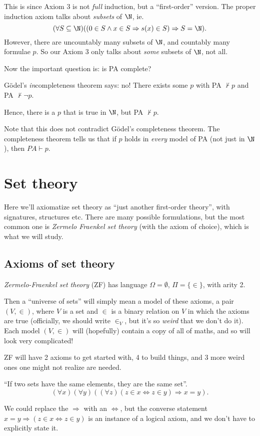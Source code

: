 \documentclass[a4paper]{article}
\begin{document}
This is since Axiom 3 is not \emph{full} induction, but a ``first-order'' version. The proper induction axiom talks about \emph{subsets} of $\N$, ie.
\[
  (\forall S\subseteq \N )((0 \in S \wedge x\in S \Rightarrow s(x)\in S)\Rightarrow S=\N).
\]
However, there are uncountably many subsets of $\N$, and countably many formulae $p$. So our Axiom 3 only talks about \emph{some} subsets of $\N$, not all.

Now the important question is: is PA complete?

G\"odel's \emph{in}completeness theorem says: no! There exists some $p$ with PA $\not\vdash p$ and PA $\not\vdash \neg p$.

Hence, there is a $p$ that is true in $\N$, but PA $\not\vdash p$.

Note that this does not contradict G\"odel's completeness theorem. The completeness theorem tells us that if $p$ holds in \emph{every} model of PA (not just in $\N$), then $PA\vdash p$.

\section{Set theory}
Here we'll axiomatize set theory as ``just another first-order theory'', with signatures, structures etc. There are many possible formulations, but the most common one is \emph{Zermelo Fraenkel set theory} (with the axiom of choice), which is what we will study.

\subsection{Axioms of set theory}
\begin{defi}
  \emph{Zermelo-Fraenkel set theory} (ZF) has language $\Omega = \emptyset$, $\Pi = \{\in\}$, with arity 2.
\end{defi}
Then a ``universe of sets'' will simply mean a model of these axioms, a pair $(V, \in)$, where $V$ is a set and $\in$ is a binary relation on $V$ in which the axioms are true (officially, we should write $\in_V$, but it's so \emph{weird} that we don't do it). Each model $(V, \in)$ will (hopefully) contain a copy of all of maths, and so will look very complicated!

ZF will have 2 axioms to get started with, 4 to build things, and 3 more weird ones one might not realize are needed.

\begin{axiom}
  ``If two sets have the same elements, they are the same set''.
  \[
    (\forall x)(\forall y)((\forall z)(z\in x\Leftrightarrow z\in y) \Rightarrow x = y).
  \]
\end{axiom}
We could replace the $\Rightarrow $ with an $\Leftrightarrow$, but the converse statement $x = y \Rightarrow (z\in x \Leftrightarrow z\in y)$ is an instance of a logical axiom, and we don't have to explicitly state it.
\end{document}

